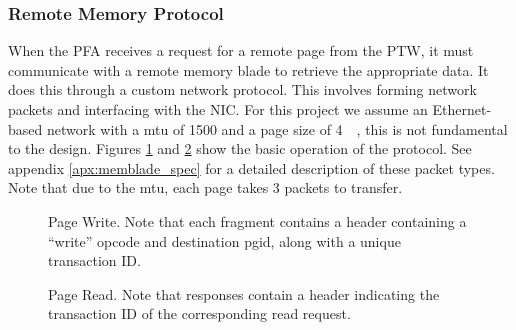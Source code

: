 \subsubsection{Remote Memory Protocol}
When the PFA receives a request for a remote page from the PTW, it must
communicate with a remote \gls{memory blade} to retrieve the appropriate data.
It does this through a custom network protocol. This involves forming network
packets and interfacing with the NIC. For this project we assume an
Ethernet-based network with a \gls{mtu} of \SI{1500}{\byte} and a page size of
\SI{4}{\kilo\byte}, this is not fundamental to the design.  Figures
\ref{fig:write_protocol} and \ref{fig:read_protocol} show the basic operation
of the protocol. See appendix \ref{apx:memblade_spec} for a detailed
description of these packet types. Note that due to the \gls{mtu}, each page
takes 3 packets to transfer.
\begin{figure}[h]
    \centering
    \begin{sequencediagram}
    \end{sequencediagram}
    \caption{Page Write. Note that each fragment contains a header containing a
    ``write'' opcode and destination \gls{pgid}, along with a unique
    transaction ID.}
		\label{fig:write_protocol}
\end{figure} 
 
\begin{figure}[h]
    \centering
    \begin{sequencediagram}
    \end{sequencediagram}
		\caption{Page Read. Note that responses contain a header indicating the
    transaction ID of the corresponding read request.}
		\label{fig:read_protocol}
\end{figure} 

